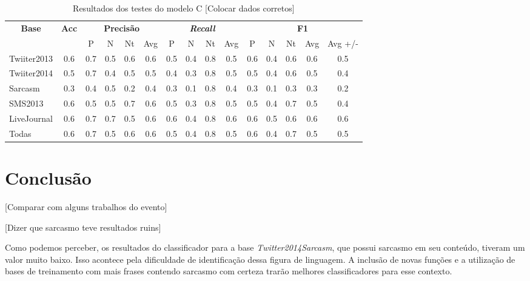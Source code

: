 \documentclass[12pt]{article}
\begin{document}
\begin{table}[H]
\centering
\begin{adjustwidth}{-1cm}{}
\begin{tabular}{lcccccccccccccc}
\multicolumn{1}{c}{\textbf{Base}} & \textbf{Acc} & \multicolumn{4}{c}{\textbf{Precisão}} & \multicolumn{4}{c}{\textit{\textbf{Recall}}} & \multicolumn{5}{c}{\textbf{F1}} \\
 &  & \multicolumn{1}{c|}{P} & \multicolumn{1}{c|}{N} & \multicolumn{1}{c|}{Nt} & Avg & \multicolumn{1}{c|}{P} & \multicolumn{1}{c|}{N} & \multicolumn{1}{c|}{Nt} & Avg & \multicolumn{1}{c|}{P} & \multicolumn{1}{c|}{N} & \multicolumn{1}{c|}{Nt} & \multicolumn{1}{c|}{Avg} & Avg +/- \\
Twiiter2013 & 0.6 & 0.7 & 0.5 & 0.6 & 0.6 & 0.5 & 0.4 & 0.8 & 0.5 & 0.6 & 0.4 & 0.6 & 0.6 & 0.5 \\ \hline
Twiiter2014 & 0.5 & 0.7 & 0.4 & 0.5 & 0.5 & 0.4 & 0.3 & 0.8 & 0.5 & 0.5 & 0.4 & 0.6 & 0.5 & 0.4 \\ \hline
Sarcasm & 0.3 & 0.4 & 0.5 & 0.2 & 0.4 & 0.3 & 0.1 & 0.8 & 0.4 & 0.3 & 0.1 & 0.3 & 0.3 & 0.2 \\ \hline
SMS2013 & 0.6 & 0.5 & 0.5 & 0.7 & 0.6 & 0.5 & 0.3 & 0.8 & 0.5 & 0.5 & 0.4 & 0.7 & 0.5 & 0.4 \\ \hline
LiveJournal & 0.6 & 0.7 & 0.7 & 0.5 & 0.6 & 0.6 & 0.4 & 0.8 & 0.6 & 0.6 & 0.5 & 0.6 & 0.6 & 0.6 \\ \hline
Todas & 0.6 & 0.7 & 0.5 & 0.6 & 0.6 & 0.5 & 0.4 & 0.8 & 0.5 & 0.6 & 0.4 & 0.7 & 0.5 & 0.5 \\ \hline
\end{tabular}
\caption{Resultados dos testes do modelo C [Colocar dados corretos]}
\label{test3}
\end{adjustwidth}
\end{table}

\section{Conclusão}\label{conclusion}

[Comparar com alguns trabalhos do evento]

[Dizer que sarcasmo teve resultados ruins]

Como podemos perceber, os resultados do classificador para a base \emph{Twitter2014Sarcasm}, que possui sarcasmo em seu conteúdo, tiveram um valor muito baixo. Isso acontece pela dificuldade de identificação dessa figura de linguagem. A inclusão de novas funções e a utilização de bases de treinamento com mais frases contendo sarcasmo com certeza trarão melhores classificadores para esse contexto.
\end{document}
